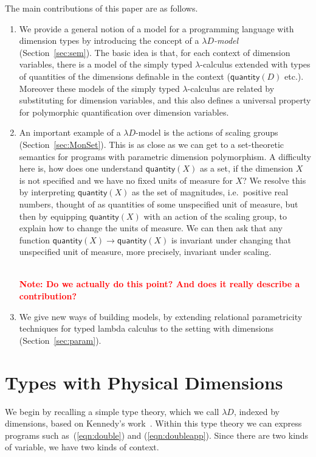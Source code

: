 \documentclass[a4paper,UKenglish]{lipics}
\newcommand\note[1]{{ \bf \textcolor{red} {\vspace{2mm}\; \\ Note: #1\\}}}
\newcommand{\msf}[1]{\mathsf{#1}} %
\newcommand{\qnt}{\msf{quantity}}
\newcommand{\Dvar}{X}
\begin{document}
The main contributions of this paper are as follows.
\begin{enumerate}
\item We provide a general notion of a model for a programming language with dimension types by introducing the concept of a \emph{$\lambda D$-model} (Section~\ref{sec:sem}). The basic idea is that, for each context of dimension variables, there is a model of the simply typed $\lambda$-calculus extended with types of quantities of the dimensions definable in the context ($\qnt(D)$ etc.). Moreover these models of the simply typed $\lambda$-calculus are related by substituting for dimension variables, and this also defines a universal property for polymorphic quantification over dimension variables.

\item An important example of a $\lambda D$-model is the actions of scaling groups (Section~\ref{sec:MonSet}). This is as close as we can get to a set-theoretic semantics for programs with parametric dimension polymorphism. A difficulty here is, how does one understand $\qnt(\Dvar)$ as a set, if the dimension $\Dvar$ is not specified and we have no fixed units of measure for $\Dvar$? We resolve this by interpreting $\qnt(\Dvar)$ as the set of magnitudes, i.e.~positive real numbers, thought of as quantities of some unspecified unit of measure, but then by equipping $\qnt(\Dvar)$ with an action of the scaling group, to explain how to change the units of measure. We can then ask that any function $\qnt(\Dvar)\to\qnt(\Dvar)$ is invariant under changing that unspecified unit of measure, more precisely, invariant under scaling.

\note{Do we actually do this point? And does it really describe a contribution?}

\item We give new ways of building models, by extending relational parametricity techniques for typed lambda calculus to the setting with dimensions (Section~\ref{sec:param}).
\end{enumerate}


\section{Types with Physical Dimensions}
\label{sec:Not}
We begin by recalling a simple type theory, which we call $\lambda D$, indexed by dimensions, based on Kennedy's work~\cite{Kennedy:1997:RPU:263699.263761}. Within this type theory we can express programs such as~(\ref{eqn:double}) and (\ref{eqn:doubleapp}). Since there are two kinds of variable, we have two kinds of context.
\end{document}
